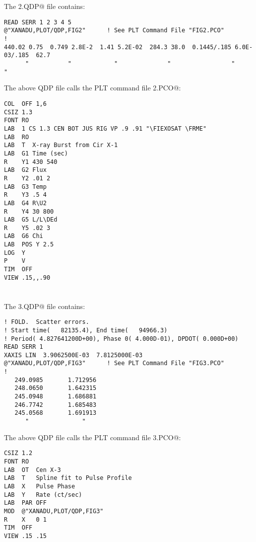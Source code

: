 \newpage
\section*{ }
\vspace{10cm}

\vfill
The \verb@FIG2.QDP@ file contains:
{\footnotesize
\begin{verbatim}
READ SERR 1 2 3 4 5
@"XANADU,PLOT/QDP,FIG2"      ! See PLT Command File "FIG2.PCO"
!
440.02 0.75  0.749 2.8E-2  1.41 5.2E-02  284.3 38.0  0.1445/.185 6.0E-03/.185  62.7
      "           "            "              "                 "                "

\end{verbatim}}
The above QDP file calls the PLT command file \verb@FIG2.PCO@:
{\footnotesize
\begin{verbatim}
COL  OFF 1,6
CSIZ 1.3
FONT RO
LAB  1 CS 1.3 CEN BOT JUS RIG VP .9 .91 "\FIEXOSAT \FRME"
LAB  RO
LAB  T  X-ray Burst from Cir X-1
LAB  G1 Time (sec)
R    Y1 430 540
LAB  G2 Flux
R    Y2 .01 2
LAB  G3 Temp
R    Y3 .5 4
LAB  G4 R\U2
R    Y4 30 800
LAB  G5 L/L\DEd
R    Y5 .02 3
LAB  G6 Chi
LAB  POS Y 2.5
LOG  Y
P    V
TIM  OFF
VIEW .15,,.90
\end{verbatim}}


\newpage
\section*{ }
\vspace{10cm}

\vfill
The \verb@FIG3.QDP@ file contains:
{\footnotesize
\begin{verbatim}
! FOLD.  Scatter errors.
! Start time(   82135.4), End time(   94966.3)
! Period( 4.827641200D+00), Phase 0( 4.000D-01), DPDOT( 0.000D+00)
READ SERR 1
XAXIS LIN  3.9062500E-03  7.8125000E-03
@"XANADU,PLOT/QDP,FIG3"      ! See PLT Command File "FIG3.PCO"
!
   249.0985       1.712956
   248.0650       1.642315
   245.0948       1.686881
   246.7742       1.685483
   245.0568       1.691913
      "               "

\end{verbatim}}
The above QDP file calls the PLT command file \verb@FIG3.PCO@:
{\footnotesize
\begin{verbatim}
CSIZ 1.2
FONT RO
LAB  OT  Cen X-3
LAB  T   Spline fit to Pulse Profile
LAB  X   Pulse Phase
LAB  Y   Rate (ct/sec)
LAB  PAR OFF
MOD  @"XANADU,PLOT/QDP,FIG3"
R    X   0 1
TIM  OFF
VIEW .15 .15
\end{verbatim}}


